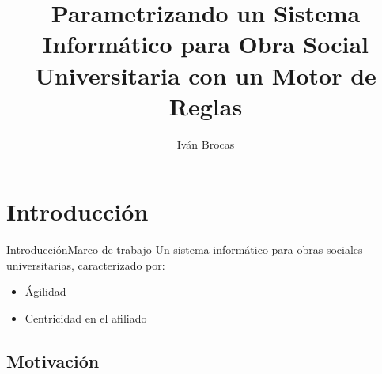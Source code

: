 \documentclass[10pt]{beamer}
\title[Parametrizando un Sistema Informático para Obra Social Universitaria]
{Parametrizando un Sistema Informático para Obra Social Universitaria con un Motor de Reglas}
\author{Iván Brocas}
\begin{document}
\maketitle

\section{Introducción}

\begin{frame}{Introducción}{Marco de trabajo}
    Un sistema informático para obras sociales universitarias, caracterizado por:
    \begin{itemize}
        \item Ágilidad
        \item Centricidad en el afiliado
    \end{itemize}
\end{frame}

\subsection{Motivación}
\end{document}

